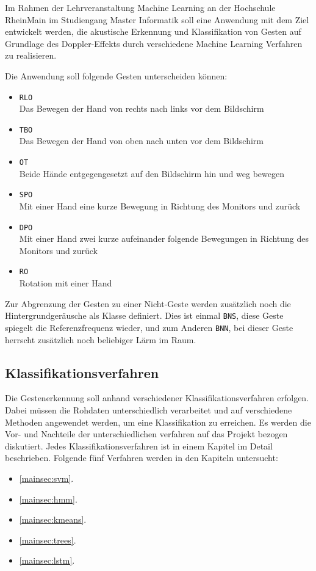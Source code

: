 Im Rahmen der Lehrveranstaltung Machine Learning an der Hochschule RheinMain im
Studiengang Master Informatik soll eine Anwendung mit dem Ziel entwickelt
werden, die akustische Erkennung und Klassifikation von Gesten auf Grundlage des
Doppler-Effekts durch verschiedene Machine Learning Verfahren zu realisieren.

Die Anwendung soll folgende Gesten unterscheiden können:
\begin{itemize}
	\item \texttt{\ac{RLO}}\\
	Das Bewegen der Hand von rechts nach links vor dem Bildschirm
	\item \texttt{\ac{TBO}}\\
	Das Bewegen der Hand von oben nach unten vor dem Bildschirm
	\item \texttt{\ac{OT}}\\
	Beide Hände entgegengesetzt auf den Bildschirm hin und weg bewegen
	\item \texttt{\ac{SPO}}\\
	Mit einer Hand eine kurze Bewegung in Richtung des Monitors und zurück
	\item \texttt{\ac{DPO}}\\
	Mit einer Hand zwei kurze aufeinander folgende Bewegungen in Richtung des Monitors und zurück
	\item \texttt{\ac{RO}}\\
	Rotation mit einer Hand
\end{itemize}

Zur Abgrenzung der Gesten zu einer Nicht-Geste werden zusätzlich noch die
Hintergrundgeräusche als Klasse definiert. Dies ist einmal \texttt{\ac{BNS}},
diese Geste spiegelt die Referenzfrequenz wieder, und zum Anderen
\texttt{\ac{BNN}}, bei dieser Geste herrscht zusätzlich noch beliebiger Lärm im
Raum.

\subsection{Klassifikationsverfahren}
Die Gestenerkennung soll anhand verschiedener Klassifikationsverfahren erfolgen.
Dabei müssen die Rohdaten unterschiedlich verarbeitet und auf verschiedene
Methoden angewendet werden, um eine Klassifikation zu erreichen. Es werden die
Vor- und Nachteile der unterschiedlichen verfahren auf das Projekt bezogen
diskutiert. Jedes Klassifikationsverfahren ist in einem Kapitel im Detail
beschrieben. Folgende fünf Verfahren werden in den Kapiteln untersucht:
\begin{itemize}
	\item \ref{mainsec:svm}. 
	\item \ref{mainsec:hmm}. 
	\item \ref{mainsec:kmeans}. 
	\item \ref{mainsec:trees}. 
	\item \ref{mainsec:lstm}. 
\end{itemize}


